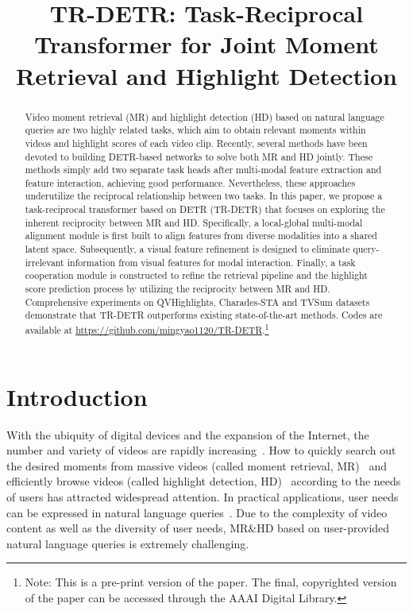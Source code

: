 \title{TR-DETR: Task-Reciprocal Transformer for Joint Moment Retrieval and Highlight Detection}



\maketitle

\begin{abstract}
    Video moment retrieval (MR) and highlight detection (HD) based on natural language queries are two highly related tasks, which aim to obtain relevant moments within videos and highlight scores of each video clip. Recently, several methods have been devoted to building DETR-based networks to solve both MR and HD jointly. These methods simply add two separate task heads after multi-modal feature extraction and feature interaction, achieving good performance. Nevertheless, these approaches underutilize the reciprocal relationship between two tasks. In this paper, we propose a task-reciprocal transformer based on DETR (TR-DETR) that focuses on exploring the inherent reciprocity between MR and HD. Specifically, a local-global multi-modal alignment module is first built to align features from diverse modalities into a shared latent space. Subsequently, a visual feature refinement is designed to eliminate query-irrelevant information from visual features for modal interaction. Finally, a task cooperation module is constructed to refine the retrieval pipeline and the highlight score prediction process by utilizing the reciprocity between MR and HD. Comprehensive experiments on QVHighlights, Charades-STA and TVSum datasets demonstrate that TR-DETR outperforms existing state-of-the-art methods. Codes are available at \url{https://github.com/mingyao1120/TR-DETR}.\footnote{Note: This is a pre-print version of the paper. The final, copyrighted version of the paper can be accessed through the AAAI Digital Library.}
\end{abstract}

\section{Introduction}
With the ubiquity of digital devices and the expansion of the Internet, the number and variety of videos are rapidly increasing~\cite{Foo_2023_CVPR}. How to quickly search out the desired moments from massive videos (called moment retrieval, MR)~\cite{gao2017tall} and efficiently browse videos (called highlight detection, HD)~\cite{DBLP:conf/mm/MolinoG18} according to the needs of users has attracted widespread attention. In practical applications, user needs can be expressed in natural language queries~\cite{DBLP:conf/aaai/00010WLW22}. Due to the complexity of video content as well as the diversity of user needs, MR\&HD based on user-provided natural language queries is extremely challenging.

